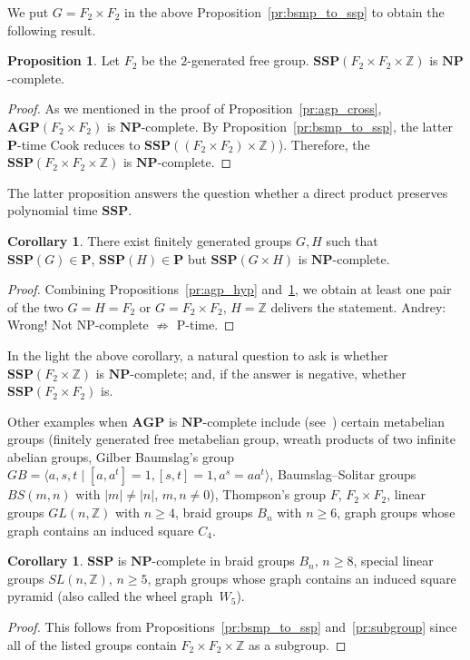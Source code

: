 \documentclass[10pt]{amsart}
\newcommand{\an}{\noindent\color{blue} Andrey: }{}
\theoremstyle{definition}
\newtheorem{proposition}[theorem]{Proposition}
\newtheorem{corollary}[theorem]{Corollary}
\def\P{{\mathbf{P}}}
\def\NP{{\mathbf{NP}}}
\def\SSP{{\mathbf{SSP}}}
\def\AGP{{\mathbf{AGP}}}
\begin{document}
We put $G=F_2\times F_2$ in the above Proposition~\ref{pr:bsmp_to_ssp} to obtain the following result.
\begin{proposition}\label{pr:ssp_cross}
Let $F_2$ be the $2$-generated free group. $\SSP(F_2\times F_2\times \mathbb Z)$ is $\NP$-complete.
\end{proposition}
\begin{proof}
As we mentioned in the proof of Proposition~\ref{pr:agp_cross}, $\AGP(F_2\times F_2)$ is $\NP$-complete. By Proposition~\ref{pr:bsmp_to_ssp}, the latter $\P$-time Cook reduces to $\SSP((F_2\times F_2)\times\mathbb Z)$). Therefore, the $\SSP(F_2\times F_2\times \mathbb Z)$ is $\NP$-complete.
\end{proof}

The latter proposition answers the question whether a direct product preserves polynomial time $\SSP$.

\begin{corollary}\label{cor:NP_complete_ssp_cross}
There exist finitely generated groups $G,H$ such that $\SSP(G)\in\P$, $\SSP(H)\in\P$ but $\SSP(G\times H)$ is $\NP$-complete.
\end{corollary}
\begin{proof}
Combining Propositions~\ref{pr:agp_hyp} and~\ref{pr:ssp_cross}, we obtain at least one pair of the two $G=H=F_2$ or $G=F_2\times F_2$, $H=\mathbb Z$ delivers the statement.{\an Wrong! Not NP-complete $\not\Rightarrow$ P-time.}
\end{proof}
In the light the above corollary, a natural question to ask is whether $\SSP(F_2\times \mathbb Z)$ is $\NP$-complete; and, if the answer is negative, whether $\SSP(F_2\times F_2)$ is.


Other examples when $\AGP$ is $\NP$-complete include (see~\cite{MNU1}) certain metabelian groups (finitely generated free metabelian group, wreath products of two infinite abelian groups, Gilber Baumslag's group $GB=\langle a,s,t\mid [a,a^t]=1, [s,t]=1, a^s=aa^t\rangle$, Baumslag--Solitar groups $BS(m,n)$ with $|m|\neq |n|$, $m,n\neq 0$), Thompson's group $F$, $F_2\times F_2$, linear groups $GL(n, \mathbb Z)$ with $n\ge 4$, braid groups $B_n$ with $n\ge 6$, graph groups whose
graph contains an induced square $C_4$.



\begin{corollary}
$\SSP$ is $\NP$-complete in braid groups $B_n$, $n\ge 8$, special linear groups $SL(n,\mathbb Z)$, $n\ge 5$, graph groups whose graph contains an induced square pyramid (also called the wheel graph~$W_5$).
\end{corollary}
\begin{proof}
This follows from Propositions~\ref{pr:bsmp_to_ssp} and~\ref{pr:subgroup} since all of the listed groups contain $F_2\times F_2\times \mathbb Z$ as a subgroup.
\end{proof}
\end{document}
